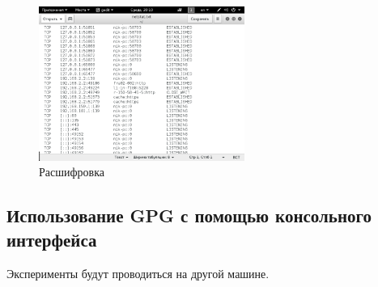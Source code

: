 \begin{figure}[!ht]
	\centering
	\includegraphics[width=0.6\textwidth]{images/18.png}
	\caption{Расшифровка}
\end{figure}

\newpage
\subsection{Использование GPG с помощью консольного интерфейса}
Эксперименты будут проводиться на другой машине.

